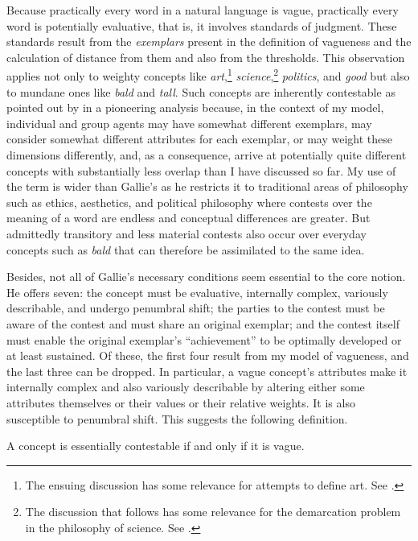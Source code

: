 Because practically every word in a natural language is vague, practically every word is potentially evaluative, that is, it involves standards of judgment. These standards result from the \emph{exemplars} present in the definition of vagueness and the calculation of distance from them and also from the thresholds. This observation applies not only to weighty concepts like \emph{art},\footnote{The ensuing discussion has some  relevance for attempts to define art. See \citet{adajian:da}.} \emph{science},\footnote{The discussion that follows has some relevance for the demarcation problem in the philosophy of science. See \citet{popper:lsd}.} \emph{politics}, and \emph{good} but also to mundane ones like \emph{bald} and \emph{tall}. Such concepts are inherently contestable as pointed out by \citet{gallie:ecc} in a pioneering analysis because, in the context of my model, individual and group agents may have somewhat different exemplars, may consider somewhat different attributes for each exemplar, or may weight these dimensions differently, and, as a consequence, arrive at potentially quite different concepts with substantially less overlap than I have discussed so far. My use of the term is wider than Gallie's as he restricts it to traditional areas of philosophy such as ethics, aesthetics, and political philosophy where contests over the meaning of a word are endless and conceptual differences are greater. But admittedly transitory and less material contests also occur over everyday concepts such as \emph{bald} that can therefore be assimilated to the same idea.

Besides, not all of Gallie's necessary conditions seem essential to the core notion. He offers seven: the concept must be evaluative, internally complex, variously describable, and undergo penumbral shift; the parties to the contest must be aware of the contest and must share an original exemplar; and the contest itself must enable the original exemplar's ``achievement'' to be optimally developed or at least sustained. Of these, the first four result from my model of vagueness, and the last three can be dropped. In particular, a vague concept's attributes make it internally complex and also variously describable by altering either some attributes themselves or their values or their relative weights. It is also susceptible to penumbral shift. This suggests the following definition.

\begin{definition}

A concept is essentially contestable if and only if it is vague.

\end{definition}

